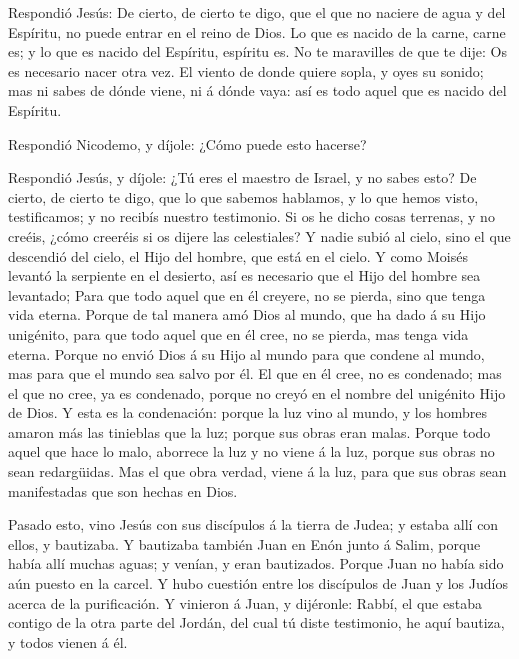  Respondió Jesús: De cierto, de cierto te digo, que el que
no naciere de agua y del Espíritu, no puede entrar en el reino de Dios.
 Lo que es nacido de la carne, carne es; y lo que es nacido
del Espíritu, espíritu es.  No te maravilles de que te dije:
Os es necesario nacer otra vez.  El viento de donde quiere
sopla, y oyes su sonido; mas ni sabes de dónde viene, ni á dónde vaya:
así es todo aquel que es nacido del Espíritu.

 Respondió Nicodemo, y díjole: ¿Cómo puede esto hacerse?

 Respondió Jesús, y díjole: ¿Tú eres el maestro de Israel,
y no sabes esto?  De cierto, de cierto te digo, que lo que
sabemos hablamos, y lo que hemos visto, testificamos; y no recibís
nuestro testimonio.  Si os he dicho cosas terrenas, y no
creéis, ¿cómo creeréis si os dijere las celestiales?  Y
nadie subió al cielo, sino el que descendió del cielo, el Hijo del
hombre, que está en el cielo.  Y como Moisés levantó la
serpiente en el desierto, así es necesario que el Hijo del hombre sea
levantado;  Para que todo aquel que en él creyere, no se
pierda, sino que tenga vida eterna.  Porque de tal manera
amó Dios al mundo, que ha dado á su Hijo unigénito, para que todo aquel
que en él cree, no se pierda, mas tenga vida eterna. 
Porque no envió Dios á su Hijo al mundo para que condene al mundo, mas
para que el mundo sea salvo por él.  El que en él cree, no
es condenado; mas el que no cree, ya es condenado, porque no creyó en el
nombre del unigénito Hijo de Dios.  Y esta es la
condenación: porque la luz vino al mundo, y los hombres amaron más las
tinieblas que la luz; porque sus obras eran malas.  Porque
todo aquel que hace lo malo, aborrece la luz y no viene á la luz, porque
sus obras no sean redargüidas.  Mas el que obra verdad,
viene á la luz, para que sus obras sean manifestadas que son hechas en
Dios.

 Pasado esto, vino Jesús con sus discípulos á la tierra de
Judea; y estaba allí con ellos, y bautizaba.  Y bautizaba
también Juan en Enón junto á Salim, porque había allí muchas aguas; y
venían, y eran bautizados.  Porque Juan no había sido aún
puesto en la carcel.  Y hubo cuestión entre los discípulos
de Juan y los Judíos acerca de la purificación.  Y vinieron
á Juan, y dijéronle: Rabbí, el que estaba contigo de la otra parte del
Jordán, del cual tú diste testimonio, he aquí bautiza, y todos vienen á
él.

